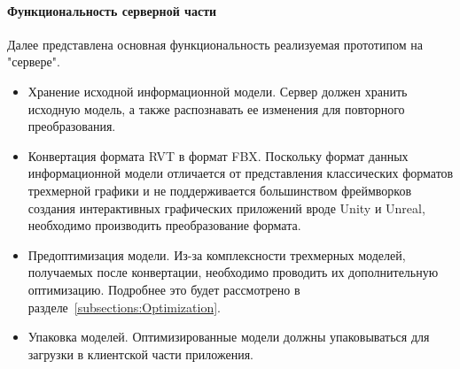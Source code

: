 ﻿\paragraph{Функциональность серверной части}

Далее представлена основная функциональность реализуемая прототипом на "сервере".

\begin{itemize}
    \item {
        Хранение исходной информационной модели.
        Сервер должен хранить исходную модель,
        а также распознавать ее изменения для повторного преобразования.
    }
    \item {
        Конвертация формата RVT в формат FBX.
        Поскольку формат данных информационной модели отличается от
        представления классических форматов трехмерной графики
        и не поддерживается большинством фреймворков
        создания интерактивных графических приложений
        вроде Unity и Unreal, необходимо производить
        преобразование формата.
    } 
    \item {
        Предоптимизация модели.
        Из-за комплексности трехмерных моделей,
        получаемых после конвертации,
        необходимо проводить их дополнительную оптимизацию.
        Подробнее это будет рассмотрено в разделе~\ref{subsections:Optimization}.
    }
    \item {
        Упаковка моделей.
        Оптимизированные модели должны упаковываться для
        загрузки в клиентской части приложения.
    }
\end{itemize}

